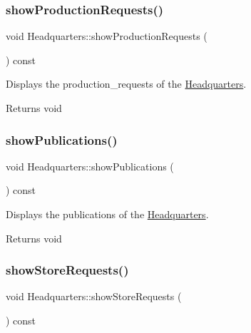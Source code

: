 \subsubsection{\texorpdfstring{show\+Production\+Requests()}{showProductionRequests()}}
{\footnotesize\ttfamily void Headquarters\+::show\+Production\+Requests (\begin{DoxyParamCaption}{ }\end{DoxyParamCaption}) const}



Displays the production\+\_\+requests of the \hyperlink{class_headquarters}{Headquarters}. 

\begin{DoxyReturn}{Returns}
void 
\end{DoxyReturn}
\mbox{\label{class_headquarters_aabdb893a0704f29221d48d6f1bb61bd6}} 
\subsubsection{\texorpdfstring{show\+Publications()}{showPublications()}}
{\footnotesize\ttfamily void Headquarters\+::show\+Publications (\begin{DoxyParamCaption}{ }\end{DoxyParamCaption}) const}



Displays the publications of the \hyperlink{class_headquarters}{Headquarters}. 

\begin{DoxyReturn}{Returns}
void 
\end{DoxyReturn}
\mbox{\label{class_headquarters_a57d34b620b22f134ffc64be46b830424}} 
\subsubsection{\texorpdfstring{show\+Store\+Requests()}{showStoreRequests()}}
{\footnotesize\ttfamily void Headquarters\+::show\+Store\+Requests (\begin{DoxyParamCaption}{ }\end{DoxyParamCaption}) const}



